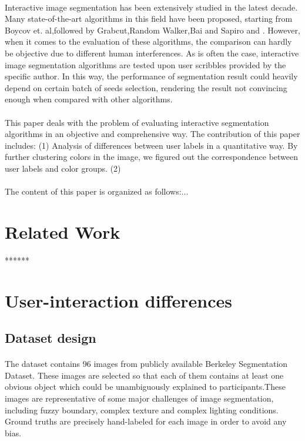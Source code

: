 \documentclass[runningheads,a4paper]{llncs}
\begin{document}
  \paragraph{}Interactive image segmentation has been extensively studied in the latest decade. Many state-of-the-art algorithms in this field have been proposed, starting from Boycov et. al\citep{boykov2001interactive},followed by Grabcut\citep{rother2004grabcut},Random Walker\citep{grady2006random},Bai and Sapiro \citep{bai2007geodesic} and \citep{gulshan2010geodesic}. However, when it comes to the evaluation of these algorithms, the comparison can hardly be objective due to different human interferences. As is often the case, interactive image segmentation algorithms are tested upon user scribbles provided by the specific author. In this way, the performance of segmentation result could heavily depend on certain batch of seeds selection, rendering the result not convincing enough when compared with other algorithms. 
 \paragraph{}This paper deals with the problem of evaluating interactive segmentation algorithms in an objective and comprehensive way. The contribution of this paper includes: (1)  Analysis of differences between user labels in a quantitative way. By further clustering colors in the image, we figured out the correspondence between user labels and color groups. 
 (2)
 \paragraph{} The content of this paper is organized as follows:...
  
\section{Related Work}

******

\section{User-interaction differences}

\subsection{Dataset design}
\paragraph{}The dataset contains 96 images from publicly available Berkeley Segmentation Dataset\citep{martin2001database}. These images are selected so that each of them contains at least one obvious object which could be unambiguously explained to participants.These images are representative of some major challenges of image segmentation, including fuzzy boundary, complex texture and complex lighting conditions. Ground truths are precisely hand-labeled for each image in order to avoid any bias.
\end{document}
